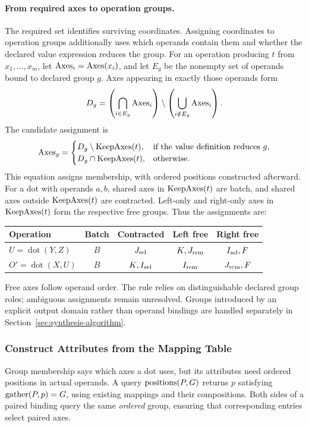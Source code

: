 \paragraph{From required axes to operation groups.}
The required set identifies surviving coordinates. Assigning coordinates to
operation groups additionally uses which operands contain them and whether
the declared value expression reduces the group. For an operation producing
$t$ from $x_1,\ldots,x_m$, let $\operatorname{Axes}_i=\operatorname{Axes}(x_i)$, and let $E_g$ be the
nonempty set of operands bound to declared group $g$. Axes appearing in exactly
those operands form
\begin{equation}
 D_g=\left(\bigcap_{i\in E_g}\operatorname{Axes}_i\right)
     \setminus\left(\bigcup_{i\notin E_g}\operatorname{Axes}_i\right).
\end{equation}
The candidate assignment is
\begin{equation}
 \operatorname{Axes}_g=\begin{cases}
 D_g\setminus\operatorname{KeepAxes}(t),&\text{if the value definition reduces }g,\\
 D_g\cap\operatorname{KeepAxes}(t),&\text{otherwise.}
 \end{cases}
 \label{eq:group-assignment}
\end{equation}
This equation assigns membership, with ordered positions constructed afterward.
For a dot with operands $a,b$, shared axes in $\operatorname{KeepAxes}(t)$ are batch, and shared
axes outside $\operatorname{KeepAxes}(t)$ are contracted. Left-only and right-only axes in
$\operatorname{KeepAxes}(t)$ form the respective free groups. Thus the assignments are:
\begin{center}
\small
\begin{tabular}{@{}lcccc@{}}\toprule
Operation & Batch & Contracted & Left free & Right free\\\midrule
$U=\operatorname{dot}(Y,Z)$ & $B$ & $J_{\mathrm{sel}}$ & $K,J_{\mathrm{rem}}$ & $I_{\mathrm{sel}},F$\\
$O'=\operatorname{dot}(X,U)$ & $B$ & $K,I_{\mathrm{sel}}$ & $I_{\mathrm{rem}}$ & $J_{\mathrm{rem}},F$\\\bottomrule
\end{tabular}
\end{center}
Free axes follow operand order. The rule relies on distinguishable declared
group roles; ambiguous assignments remain unresolved. Groups introduced by an
explicit output domain rather than operand bindings are handled separately
in Section~\ref{sec:synthesis-algorithm}.

\FloatBarrier
\subsubsection{Construct Attributes from the Mapping Table}
\label{sec:attribute-construction}
Group membership says which axes a dot uses, but its attributes need ordered
positions in actual operands. A query $\operatorname{positions}(P,G)$ returns $p$ satisfying
$\operatorname{gather}(P,p)=G$, using existing mappings and their compositions. Both sides
of a paired binding query the same \emph{ordered} group, ensuring that
corresponding entries select paired axes.

